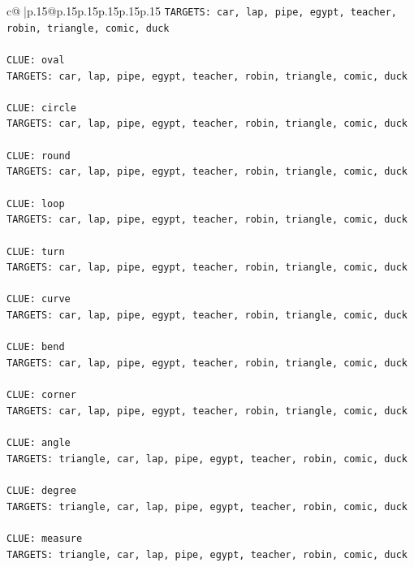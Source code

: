 \documentclass{article}
\begin{document}
{\begin{supertabular}{c@{$\;$}|p{.15\linewidth}@{}p{.15\linewidth}p{.15\linewidth}p{.15\linewidth}p{.15\linewidth}p{.15\linewidth}}
{{{\texttt{TARGETS: car, lap, pipe, egypt, teacher, robin, triangle, comic, duck} \\
\\ 
\texttt{CLUE: oval} \\
\texttt{TARGETS: car, lap, pipe, egypt, teacher, robin, triangle, comic, duck} \\
\\ 
\texttt{CLUE: circle} \\
\texttt{TARGETS: car, lap, pipe, egypt, teacher, robin, triangle, comic, duck} \\
\\ 
\texttt{CLUE: round} \\
\texttt{TARGETS: car, lap, pipe, egypt, teacher, robin, triangle, comic, duck} \\
\\ 
\texttt{CLUE: loop} \\
\texttt{TARGETS: car, lap, pipe, egypt, teacher, robin, triangle, comic, duck} \\
\\ 
\texttt{CLUE: turn} \\
\texttt{TARGETS: car, lap, pipe, egypt, teacher, robin, triangle, comic, duck} \\
\\ 
\texttt{CLUE: curve} \\
\texttt{TARGETS: car, lap, pipe, egypt, teacher, robin, triangle, comic, duck} \\
\\ 
\texttt{CLUE: bend} \\
\texttt{TARGETS: car, lap, pipe, egypt, teacher, robin, triangle, comic, duck} \\
\\ 
\texttt{CLUE: corner} \\
\texttt{TARGETS: car, lap, pipe, egypt, teacher, robin, triangle, comic, duck} \\
\\ 
\texttt{CLUE: angle} \\
\texttt{TARGETS: triangle, car, lap, pipe, egypt, teacher, robin, comic, duck} \\
\\ 
\texttt{CLUE: degree} \\
\texttt{TARGETS: triangle, car, lap, pipe, egypt, teacher, robin, comic, duck} \\
\\ 
\texttt{CLUE: measure} \\
\texttt{TARGETS: triangle, car, lap, pipe, egypt, teacher, robin, comic, duck} \\
}}}
\end{supertabular}}
\end{document}

